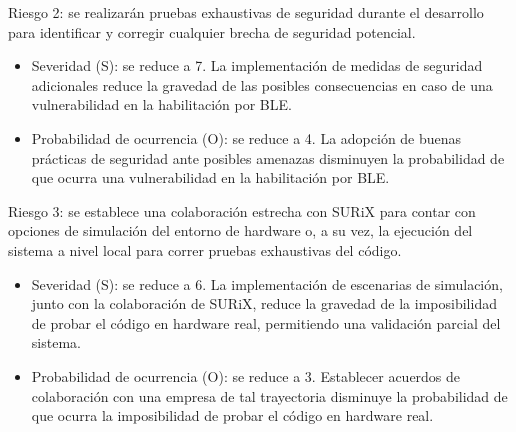 \documentclass[
11pt, %
codirector, %
]{charter}
\begin{document}
Riesgo 2: se realizarán pruebas exhaustivas de seguridad durante el desarrollo para identificar y corregir cualquier brecha de seguridad potencial.
\begin{itemize}
\item Severidad (S): se reduce a 7. La implementación de medidas de seguridad adicionales reduce la gravedad de las posibles consecuencias en caso de una vulnerabilidad en la habilitación por BLE.
\item Probabilidad de ocurrencia (O): se reduce a 4. La adopción de buenas prácticas de seguridad ante posibles amenazas disminuyen la probabilidad de que ocurra una vulnerabilidad en la habilitación por BLE.
\end{itemize}

Riesgo 3: se establece una colaboración estrecha con SURiX para contar con opciones de simulación del entorno de hardware o, a su vez, la ejecución del sistema a nivel local para correr pruebas exhaustivas del código.
\begin{itemize}
\item Severidad (S): se reduce a 6. La implementación de escenarias de simulación, junto con la colaboración de SURiX, reduce la gravedad de la imposibilidad de probar el código en hardware real, permitiendo una validación parcial del sistema.
\item Probabilidad de ocurrencia (O): se reduce a 3. Establecer acuerdos de colaboración con una empresa de tal trayectoria disminuye la probabilidad de que ocurra la imposibilidad de probar el código en hardware real.
\end{itemize}
\end{document}
